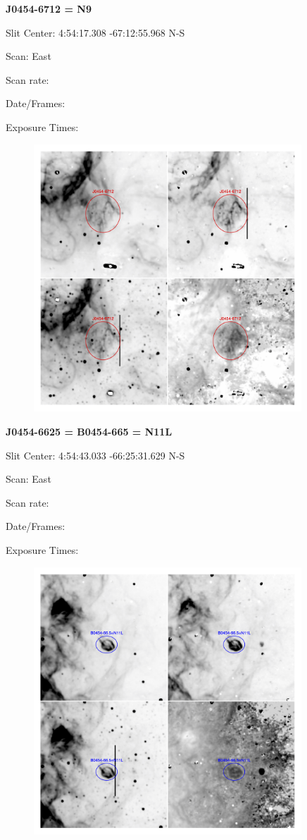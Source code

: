 \documentclass[11pt]{article}
\begin{document}
\newpage
{\bf J0454-6712 = N9}

Slit Center:   4:54:17.308    -67:12:55.968     N-S

Scan:  East

Scan rate:  

Date/Frames:

Exposure Times:  

\begin{figure}
\includegraphics[width=10.05cm]{snapshots/J0454-6712.png}
\end{figure}

\newpage
{\bf J0454-6625 = B0454-665 = N11L}

Slit Center:   4:54:43.033    -66:25:31.629     N-S

Scan:  East

Scan rate:  

Date/Frames:

Exposure Times:  

\begin{figure}
\includegraphics[width=10.05cm]{snapshots/B0454-665.png}
\end{figure}
\end{document}
